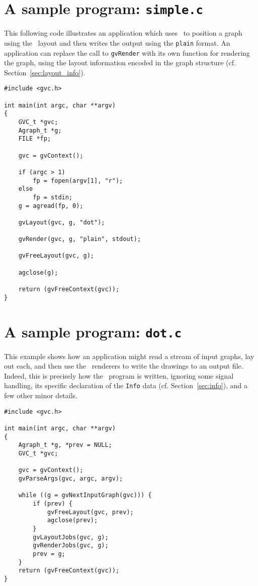 \section{A sample program: {\tt simple.c}}
\label{sec:simple}
This following code illustrates an application which uses \gviz\ to
position a graph using the \dot\ layout and then writes the output
using the {\tt plain} format.
An application can replace the call to {\tt gvRender} with its own
function for rendering the graph, using the layout information
encoded in the graph structure (cf. Section~\ref{sec:layout_info}).
\begin{verbatim}
#include <gvc.h>

int main(int argc, char **argv)
{
    GVC_t *gvc; 
    Agraph_t *g;
    FILE *fp;

    gvc = gvContext();

    if (argc > 1)
        fp = fopen(argv[1], "r");
    else    
        fp = stdin;
    g = agread(fp, 0);

    gvLayout(gvc, g, "dot");

    gvRender(gvc, g, "plain", stdout);

    gvFreeLayout(gvc, g);

    agclose(g);

    return (gvFreeContext(gvc));
}
\end{verbatim}
\newpage

\section{A sample program: {\tt dot.c}}
\label{sec:dot}
This example shows how an application might read a stream of input graphs,
lay out each, and then use the \gviz\ renderers to write the drawings
to an output file. Indeed, this
is precisely how the \dot\ program is written, ignoring some signal
handling, its specific declaration of 
the {\tt Info} data (cf. Section~\ref{sec:info}), and a few other
minor details.
\begin{verbatim}
#include <gvc.h>
    
int main(int argc, char **argv)
{   
    Agraph_t *g, *prev = NULL;
    GVC_t *gvc;

    gvc = gvContext();
    gvParseArgs(gvc, argc, argv);
    
    while ((g = gvNextInputGraph(gvc))) {
        if (prev) {
            gvFreeLayout(gvc, prev);
            agclose(prev);
        }
        gvLayoutJobs(gvc, g); 
        gvRenderJobs(gvc, g);
        prev = g;
    }
    return (gvFreeContext(gvc));
}

\end{verbatim}
\newpage

